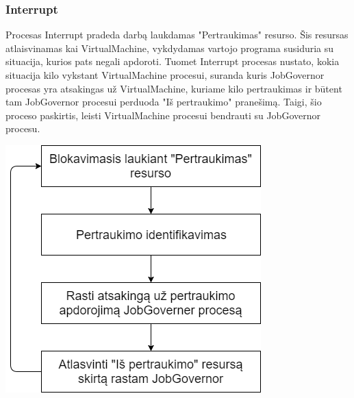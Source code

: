 \documentclass{scrartcl}
\begin{document}
      \subsubsection{Interrupt}
        Procesas Interrupt pradeda darbą laukdamas "Pertraukimas" resurso. Šis resursas atlaisvinamas kai VirtualMachine, vykdydamas vartojo programa susiduria su situacija, kurios pats negali apdoroti. Tuomet Interrupt procesas nustato, kokia situacija kilo vykstant VirtualMachine procesui, suranda kuris JobGovernor procesas yra atsakingas už VirtualMachine, kuriame kilo pertraukimas ir būtent tam JobGovernor procesui perduoda "Iš pertraukimo" pranešimą. Taigi, šio proceso paskirtis, leisti VirtualMachine procesui bendrauti su JobGovernor procesu.
        \begin{center}
          \includegraphics[scale=0.5]{Interrupt}
        \end{center}
\end{document}
